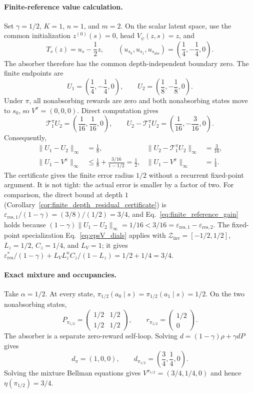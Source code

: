 \documentclass{article}
\theoremstyle{plain}
\theoremstyle{definition}
\theoremstyle{remark}
\begin{document}
\paragraph{Finite-reference value calculation.}
Set $\gamma=1/2$, $K=1$, $n=1$, and $m=2$. On the scalar latent space, use
the common initialization $z^{(0)}(s)=0$, head $V_\psi(z,s)=z$, and
\[
T_s(z)=u_s-\frac12z,\qquad
(u_{s_0},u_{s_1},u_{s_{\mathrm{abs}}})
=\left(\frac14,-\frac14,0\right).
\]
The absorber therefore has the common depth-independent boundary zero. The
finite endpoints are
\[
U_1=\left(\frac14,-\frac14,0\right),\qquad
U_2=\left(\frac18,-\frac18,0\right).
\]
Under $\pi$, all nonabsorbing rewards are zero and both nonabsorbing states
move to $s_0$, so $V^\pi=(0,0,0)$. Direct computation gives
\[
\mathcal T_1^\pi U_2
=\left(\frac1{16},\frac1{16},0\right),\qquad
U_2-\mathcal T_1^\pi U_2
=\left(\frac1{16},-\frac3{16},0\right).
\]
Consequently,
\begin{align*}
\|U_1-U_2\|_\infty&=\frac18,
&
\|U_2-\mathcal T_1^\pi U_2\|_\infty&=\frac3{16},\\
\|U_1-V^\pi\|_\infty
&\le \frac18+\frac{3/16}{1-1/2}=\frac12,
&
\|U_1-V^\pi\|_\infty&=\frac14.
\end{align*}
The certificate gives the finite error radius $1/2$ without a recurrent
fixed-point argument. It is not tight: the actual error is smaller by a factor
of two. For comparison, the direct bound at depth $1$
(Corollary~\ref{cor:finite_depth_residual_certificate}) is
$\varepsilon_{\mathrm{res},1}/(1-\gamma)=(3/8)/(1/2)=3/4$, and
Eq.~\eqref{eq:finite_reference_gain} holds because
$(1-\gamma)\|U_1-U_2\|_\infty=1/16<3/16
=\varepsilon_{\mathrm{res},1}-\varepsilon_{\mathrm{res},2}$.
The fixed-point specialization Eq.~\eqref{eq:epsV_dials} applies with
$\mathcal Z_{\mathrm{inv}}=[-1/2,1/2]$, $L_z=1/2$, $C_z=1/4$, and
$L_V=1$; it gives
$\varepsilon_{\mathrm{res}}^*/(1-\gamma)+L_VL_z^nC_z/(1-L_z)=1/2+1/4=3/4$.

\paragraph{Exact mixture and occupancies.}
Take $\alpha=1/2$. At every state,
$\pi_{1/2}(a_0\mid s)=\pi_{1/2}(a_1\mid s)=1/2$. On the two nonabsorbing states,
\[
P_{\pi_{1/2}}
=\begin{pmatrix}1/2&1/2\\1/2&1/2\end{pmatrix},
\qquad
r_{\pi_{1/2}}=\begin{pmatrix}1/2\\0\end{pmatrix}.
\]
The absorber is a separate zero-reward self-loop. Solving
$d=(1-\gamma)\rho+\gamma dP$ gives
\[
d_\pi=(1,0,0),\qquad
d_{\pi_{1/2}}=\left(\frac34,\frac14,0\right).
\]
Solving the mixture Bellman equations gives
$V^{\pi_{1/2}}=(3/4,1/4,0)$ and hence
$\eta(\pi_{1/2})=3/4$.
\end{document}
